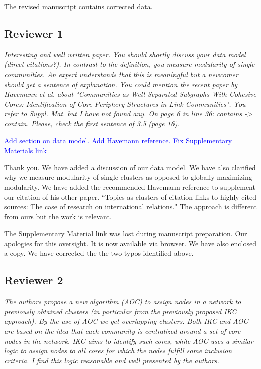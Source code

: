 \documentclass[11pt, oneside]{article}   	%
\begin{document}
\noindent The revised manuscript contains corrected data.


\subsection*{Reviewer 1} \emph{Interesting and well written paper. You should shortly discuss your data model (direct citations?). In contrast to the definition, you measure modularity of single communities. An expert understands that this is meaningful but a newcomer should get a sentence of explanation.  You could mention the recent paper by Havemann et al. about "Communities as Well Separated Subgraphs With Cohesive Cores: Identification of Core-Periphery Structures in Link Communities". You refer to Suppl. Mat. but I have not found any. On page 6 in line 36: contains -> contain. Please, check the first sentence of 3.5 (page 16).}

\textcolor{blue}{Add section on data model. Add Havemann reference. Fix Supplementary Materials link}

\vspace{4 mm}
Thank you. We have added a discussion of our data model. We have also clarified why we measure modularity of single clusters as opposed to globally maximizing modularity. We have added the recommended 
Havemann reference to supplement our citation of his other paper. ``Topics as clusters of citation links to highly cited sources: The case of research on international relations." The approach is different from 
ours but the work is relevant.

The Supplementary Material link was lost during manuscript preparation. Our apologies for this oversight. It is now available via browser. We have also enclosed a copy. We have corrected the the two typos identified
above.

\clearpage

\subsection*{Reviewer 2} \emph{The authors propose a new algorithm (AOC) to assign nodes in a network to previously obtained clusters (in particular from the previously proposed IKC approach). By the use of AOC we get overlapping clusters. Both IKC and AOC are based on the idea that each community is centralized around a set of core nodes in the network. IKC aims to identify such cores, while AOC uses a similar logic to assign nodes to all cores for which the nodes fulfill some inclusion criteria. I find this logic reasonable and well presented by the authors.} 
\end{document}
